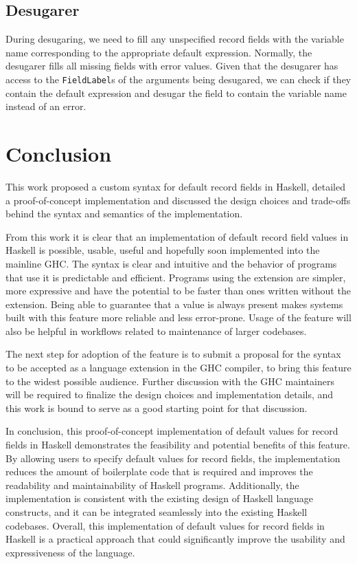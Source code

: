 \documentclass[en]{pracamgr}
\newcommand{\code}[1]{\lstinline[breaklines=true]{#1}}
\begin{document}
\section{Desugarer}
During desugaring, we need to fill any unspecified record fields with the variable name corresponding to the appropriate default expression.
Normally, the desugarer fills all missing fields with error values.
Given that the desugarer has access to the \code{FieldLabel}s of the arguments being desugared, we can check if they contain the default expression and 
desugar the field to contain the variable name instead of an error.

\chapter{Conclusion}\label{ch:concl}
This work proposed a custom syntax for default record fields in Haskell, detailed a proof-of-concept implementation and discussed the design choices
and trade-offs behind the syntax and semantics of the implementation.

From this work it is clear that an implementation of default record field values in Haskell is possible, usable, useful and hopefully soon implemented
into the mainline GHC. The syntax is clear and intuitive and the behavior of programs that use it is predictable and efficient.
Programs using the extension are simpler, more expressive and have the potential to be faster than ones written without the extension.
Being able to guarantee that a value is always present makes systems built with this feature more reliable and less error-prone.
Usage of the feature will also be helpful in workflows related to maintenance of larger codebases.

The next step for adoption of the feature is to submit a proposal for the syntax to be accepted 
as a language extension in the GHC compiler, to bring this feature to the widest possible audience.
Further discussion with the GHC maintainers will be required to finalize the design choices and implementation details, 
and this work is bound to serve as a good starting point for that discussion.

In conclusion, this proof-of-concept implementation of default values for record fields in Haskell
demonstrates the feasibility and potential benefits of this feature. 
By allowing users to specify default values for record fields, 
the implementation reduces the amount of boilerplate code that is 
required and improves the readability and maintainability of Haskell programs.
Additionally, the implementation is consistent with the existing design of Haskell language constructs, 
and it can be integrated seamlessly into the existing Haskell codebases. 
Overall, this implementation of default values for record fields in Haskell 
is a practical approach that could significantly improve the usability and expressiveness of the language.
\end{document}
